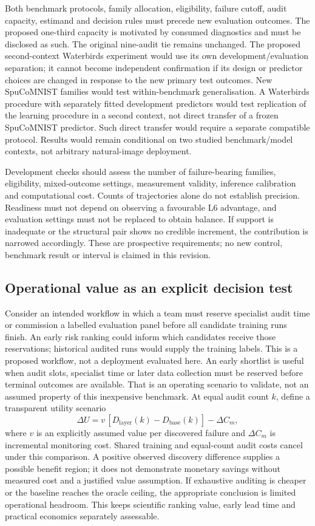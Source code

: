 Both benchmark protocols, family allocation, eligibility, failure cutoff, audit capacity, estimand and decision rules must precede new evaluation outcomes. The proposed one-third capacity is motivated by consumed diagnostics and must be disclosed as such. The original nine-audit tie remains unchanged. The proposed second-context Waterbirds experiment would use its own development/evaluation separation; it cannot become independent confirmation if its design or predictor choices are changed in response to the new primary test outcomes. New SpuCoMNIST families would test within-benchmark generalisation. A Waterbirds procedure with separately fitted development predictors would test replication of the learning procedure in a second context, not direct transfer of a frozen SpuCoMNIST predictor. Such direct transfer would require a separate compatible protocol. Results would remain conditional on two studied benchmark/model contexts, not arbitrary natural-image deployment.

Development checks should assess the number of failure-bearing families, eligibility, mixed-outcome settings, measurement validity, inference calibration and computational cost. Counts of trajectories alone do not establish precision. Readiness must not depend on observing a favourable L6 advantage, and evaluation settings must not be replaced to obtain balance. If support is inadequate or the structural pair shows no credible increment, the contribution is narrowed accordingly. These are prospective requirements; no new control, benchmark result or interval is claimed in this revision.

\subsection{Operational value as an explicit decision test}
Consider an intended workflow in which a team must reserve specialist audit time or commission a labelled evaluation panel before all candidate training runs finish. An early risk ranking could inform which candidates receive those reservations; historical audited runs would supply the training labels. This is a proposed workflow, not a deployment evaluated here. An early shortlist is useful when audit slots, specialist time or later data collection must be reserved before terminal outcomes are available. That is an operating scenario to validate, not an assumed property of this inexpensive benchmark. At equal audit count $k$, define a transparent utility scenario
\begin{equation}
\Delta U=v\,[D_{\mathrm{layer}}(k)-D_{\mathrm{base}}(k)]-\Delta C_m,
\tag{9}\end{equation}
where $v$ is an explicitly assumed value per discovered failure and $\Delta C_m$ is incremental monitoring cost. Shared training and equal-count audit costs cancel under this comparison. A positive observed discovery difference supplies a possible benefit region; it does not demonstrate monetary savings without measured cost and a justified value assumption. If exhaustive auditing is cheaper or the baseline reaches the oracle ceiling, the appropriate conclusion is limited operational headroom. This keeps scientific ranking value, early lead time and practical economics separately assessable.

